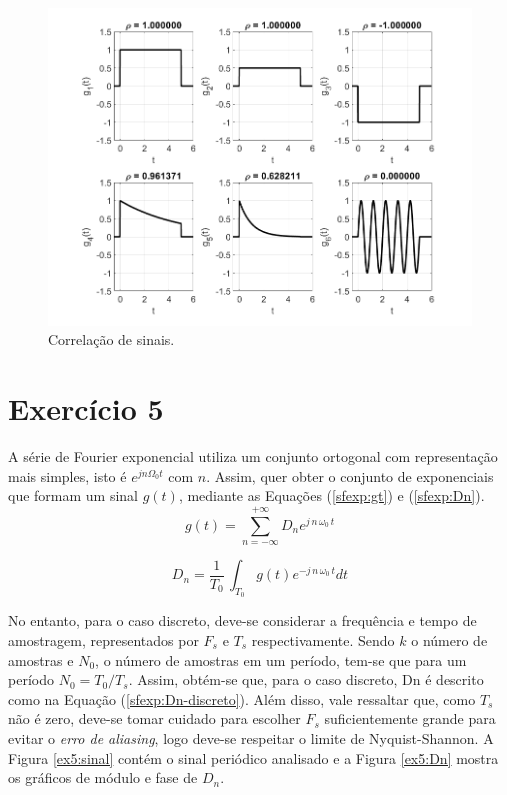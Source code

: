 \documentclass[a4paper,12pt,oneside,openany,table,xcdraw]{article}
\begin{document}
\vspace{0.4cm}
\begin{figure}[H]
\centering
\includegraphics[width=16cm]{ex4-corr}
\caption{Correlação de sinais.}
\label{ex4:corr}
\end{figure}

\vspace{0.3cm}
\section{Exercício 5}
A série de Fourier exponencial utiliza um conjunto ortogonal com representação mais simples, isto é $e^{jn\Omega_0t}$ com $n$. Assim, quer obter o conjunto de exponenciais que formam um sinal $g(t)$, mediante as Equações (\ref{sfexp:gt}) e (\ref{sfexp:Dn}).
\vspace{0.4cm}
\begin{equation} \label{sfexp:gt}
g(t) = \sum_{n=-\infty} ^{+\infty} D_n e ^{j\, n\, \omega_0\, t}
\end{equation}

\begin{equation} \label{sfexp:Dn}
D_n = \dfrac{1}{T_0}\, \int_{T_0} g(t) e ^{-j\, n\, \omega_0\, t} dt
\end{equation}
\vspace{0.4cm}

No entanto, para o caso discreto, deve-se considerar a frequência e tempo de amostragem, representados por $F_s$ e $T_s$ respectivamente. Sendo $k$ o número de amostras e $N_0$, o número de amostras em um período, tem-se que para um período $N_0=T_0/T_s$. Assim, obtém-se que, para o caso discreto, Dn é descrito como na Equação (\ref{sfexp:Dn-discreto}). Além disso, vale ressaltar que, como $T_s$ não é zero, deve-se tomar cuidado para escolher $F_s$ suficientemente grande para evitar o \textit{erro de aliasing}, logo deve-se respeitar o limite de Nyquist-Shannon. A Figura \ref{ex5:sinal} contém o sinal periódico analisado e a Figura \ref{ex5:Dn} mostra os gráficos de módulo e fase de $D_n$.
\end{document}
